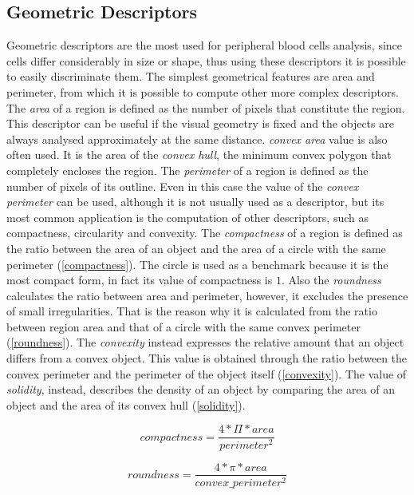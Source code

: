 \documentclass[final,a4paper,12pt,english]{UnicaPhdThesis3}
\begin{document}
	\subsection{Geometric Descriptors} %
	Geometric descriptors are the most used for peripheral blood cells analysis, since cells differ considerably in size or shape, thus using these descriptors it is possible to easily discriminate them. The simplest geometrical features are area and perimeter, from which it is possible to compute other more complex descriptors. The \textit{area} of a region is defined as the number of pixels that constitute the region. This descriptor can be useful if the visual geometry is fixed and the objects are always analysed approximately at the same distance. \textit{convex area} value is also often used. It is the area of the \textit{convex hull}, the minimum convex polygon that completely encloses the region.
	The \textit{perimeter} of a region is defined as the number of pixels of its outline. Even in this case the value of the \textit{convex perimeter} can be used, although it is not usually used as a descriptor, but its most common application is the computation of other descriptors, such as compactness, circularity and convexity. The \textit{compactness} of a region is defined as the ratio between the area of an object and the area of a circle with the same perimeter (\ref{compactness}). The circle is used as a benchmark because it is the most compact form, in fact its value of compactness is $1$. Also the \textit{roundness} calculates the ratio between area and perimeter, however, it excludes the presence of small irregularities. That is the reason why it is calculated from the ratio between region area and that of a circle with the same convex perimeter (\ref{roundness}). The \textit{convexity} instead expresses the relative amount that an object differs from a convex object. This value is obtained through the ratio between the convex perimeter and the perimeter of the object itself (\ref{convexity}). The value of \textit{solidity}, instead, describes the density of an object by comparing the area of an object and the area of its convex hull (\ref{solidity}).
	
	\begin{equation}\label{compactness}
	compactness=\frac{4*\Pi*area}{perimeter^2}
	\end{equation}
	
	\begin{equation}\label{roundness}
	roundness=\frac{4*\pi*area}{convex\_perimeter^2}
	\end{equation}
	
\end{document}
